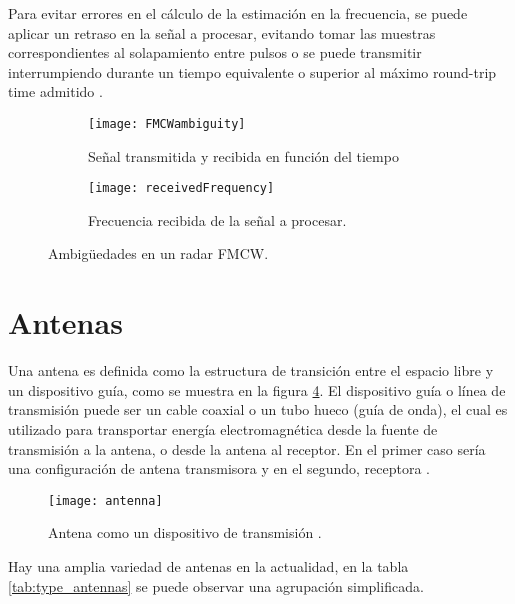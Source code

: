 Para evitar errores en el cálculo de la estimación en la frecuencia, se puede aplicar un retraso en la señal a procesar, evitando tomar las muestras correspondientes al solapamiento entre pulsos o se puede transmitir interrumpiendo durante un tiempo equivalente o superior al máximo round-trip time admitido \cite{Varavin2007a}.

\begin{figure}
  \centering
  \begin{subfigure}[b]{0.7\textwidth}
    \texttt{[image: FMCWambiguity]}
    \caption{Señal transmitida y recibida en función del tiempo}
    \label{fig:fmcwAmbiguity}   
  \end{subfigure}

  \begin{subfigure}[b]{0.7\textwidth}
    \texttt{[image: receivedFrequency]}
    \caption{Frecuencia recibida de la señal a procesar.}
    \label{fig:modulationDelayed}
  \end{subfigure}             
  \caption{Ambigüedades en un radar FMCW.}
\end{figure}

\section{Antenas}

Una antena es definida como la estructura de transición entre el espacio libre y un dispositivo guía, como se muestra en la 
figura \ref{fig:antenna}. El dispositivo guía o línea de transmisión puede ser un cable coaxial o un tubo hueco (guía de 
onda), el cual es utilizado para transportar energía electromagnética desde la fuente de transmisión a la antena, o desde la 
antena al receptor. En el primer caso sería una configuración de antena transmisora y en el segundo, receptora \cite{Balanis2012}.
\begin{figure}[H]
 \centering
 \texttt{[image: antenna]}
 \caption{Antena como un dispositivo de transmisión \cite{Balanis2012}.}
 \label{fig:antenna}
\end{figure}

Hay una amplia variedad de antenas en la actualidad, en la tabla \ref{tab:type_antennas} se puede observar una agrupación 
simplificada.


